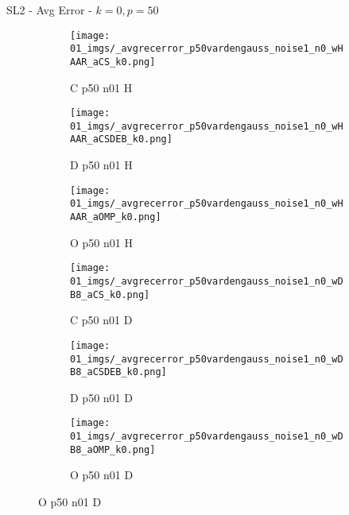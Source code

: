 \begin{frame}{SL2 - Avg Error - $k=0,p=50$}{}
\begin{figure}
\begin{subfigure}{0.13\textwidth}
\texttt{[image: 01\_imgs/\_avgrecerror\_p50vardengauss\_noise1\_n0\_wHAAR\_aCS\_k0.png]}
\caption*{\tiny C p50 n01 H}
\end{subfigure}
\begin{subfigure}{0.13\textwidth}
\texttt{[image: 01\_imgs/\_avgrecerror\_p50vardengauss\_noise1\_n0\_wHAAR\_aCSDEB\_k0.png]}
\caption*{\tiny D p50 n01 H}
\end{subfigure}
\begin{subfigure}{0.13\textwidth}
\texttt{[image: 01\_imgs/\_avgrecerror\_p50vardengauss\_noise1\_n0\_wHAAR\_aOMP\_k0.png]}
\caption*{\tiny O p50 n01 H}
\end{subfigure}
\begin{subfigure}{0.13\textwidth}
\texttt{[image: 01\_imgs/\_avgrecerror\_p50vardengauss\_noise1\_n0\_wDB8\_aCS\_k0.png]}
\caption*{\tiny C p50 n01 D}
\end{subfigure}
\begin{subfigure}{0.13\textwidth}
\texttt{[image: 01\_imgs/\_avgrecerror\_p50vardengauss\_noise1\_n0\_wDB8\_aCSDEB\_k0.png]}
\caption*{\tiny D p50 n01 D}
\end{subfigure}
\begin{subfigure}{0.13\textwidth}
\texttt{[image: 01\_imgs/\_avgrecerror\_p50vardengauss\_noise1\_n0\_wDB8\_aOMP\_k0.png]}
\caption*{\tiny O p50 n01 D}
\end{subfigure}

\vspace{5pt}


\end{figure}
\end{frame}
